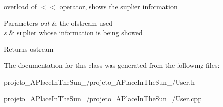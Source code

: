 overload of $<$$<$ operator, shows the suplier information 


\begin{DoxyParams}{Parameters}
{\em out} & the ofstream used\\
\hline
{\em s} & suplier whose information is being showed\\
\hline
\end{DoxyParams}
\begin{DoxyReturn}{Returns}
ostream 
\end{DoxyReturn}


The documentation for this class was generated from the following files\+:\begin{DoxyCompactItemize}
\item 
projeto\+\_\+\+A\+Place\+In\+The\+Sun\+\_/projeto\+\_\+\+A\+Place\+In\+The\+Sun\+\_/User.\+h\item 
projeto\+\_\+\+A\+Place\+In\+The\+Sun\+\_/projeto\+\_\+\+A\+Place\+In\+The\+Sun\+\_/User.\+cpp\end{DoxyCompactItemize}
